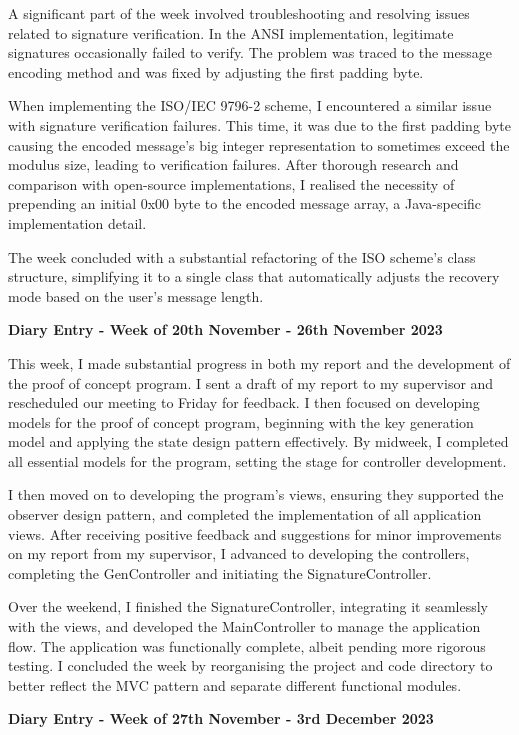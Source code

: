 \documentclass[]{final_report}
\theoremstyle{definition}
\begin{document}
A significant part of the week involved troubleshooting and resolving issues related to signature
verification. In the ANSI implementation, legitimate signatures occasionally failed to verify. The
problem was traced to the message encoding method and was fixed by adjusting the first padding byte.

When implementing the ISO/IEC 9796-2 scheme, I encountered a similar issue with signature
verification failures. This time, it was due to the first padding byte causing the encoded message's
big integer representation to sometimes exceed the modulus size, leading to verification failures.
After thorough research and comparison with open-source implementations, I realised the necessity of
prepending an initial 0x00 byte to the encoded message array, a Java-specific implementation detail.

The week concluded with a substantial refactoring of the ISO scheme's class structure, simplifying
it to a single class that automatically adjusts the recovery mode based on the user's message
length.

\textbf{Diary Entry - Week of 20th November - 26th November 2023}

This week, I made substantial progress in both my report and the development of the proof of concept
program. I sent a draft of my report to my supervisor and rescheduled our meeting to Friday for
feedback. I then focused on developing models for the proof of concept program, beginning with the
key generation model and applying the state design pattern effectively. By midweek, I completed all
essential models for the program, setting the stage for controller development.

I then moved on to developing the program's views, ensuring they supported the observer design
pattern, and completed the implementation of all application views. After receiving positive
feedback and suggestions for minor improvements on my report from my supervisor, I advanced to
developing the controllers, completing the GenController and initiating the SignatureController.

Over the weekend, I finished the SignatureController, integrating it seamlessly with the views, and
developed the MainController to manage the application flow. The application was functionally
complete, albeit pending more rigorous testing. I concluded the week by reorganising the project and
code directory to better reflect the MVC pattern and separate different functional modules.


\textbf{Diary Entry - Week of 27th November - 3rd December 2023}
\end{document}
